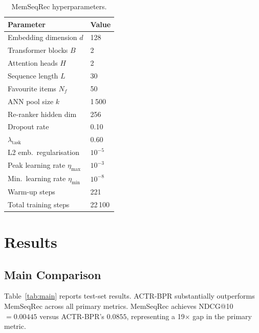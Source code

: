 \documentclass[conference]{IEEEtran}
\begin{document}
\begin{table}[h]
\centering
\caption{MemSeqRec hyperparameters.}
\label{tab:hyper}
\begin{tabular}{ll}
\toprule
\textbf{Parameter} & \textbf{Value} \\
\midrule
Embedding dimension $d$ & 128 \\
Transformer blocks $B$ & 2 \\
Attention heads $H$ & 2 \\
Sequence length $L$ & 30 \\
Favourite items $N_f$ & 50 \\
ANN pool size $k$ & 1\,500 \\
Re-ranker hidden dim & 256 \\
Dropout rate & 0.10 \\
$\lambda_{\text{task}}$ & 0.60 \\
L2 emb.\ regularisation & $10^{-5}$ \\
Peak learning rate $\eta_{\max}$ & $10^{-3}$ \\
Min.\ learning rate $\eta_{\min}$ & $10^{-8}$ \\
Warm-up steps & 221 \\
Total training steps & 22\,100 \\
\bottomrule
\end{tabular}
\end{table}

\section{Results}

\subsection{Main Comparison}

Table~\ref{tab:main} reports test-set results.
ACTR-BPR substantially outperforms MemSeqRec across all primary
metrics.
MemSeqRec achieves NDCG@10~$= 0.00445$ versus ACTR-BPR's
$0.0855$, representing a 19$\times$ gap in the primary metric.
\end{document}
